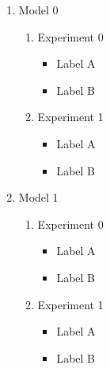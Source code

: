 \begin{enumerate}

\item Model 0

      \begin{enumerate}

      \item Experiment 0

            \begin{itemize}
	    \item Label A
	    \item Label B
	    \end{itemize}

      \item Experiment 1

            \begin{itemize}
	    \item Label A
	    \item Label B
	    \end{itemize}

      \end{enumerate}


\item Model 1

      \begin{enumerate}

      \item Experiment 0

            \begin{itemize}
	    \item Label A
	    \item Label B
	    \end{itemize}

      \item Experiment 1

            \begin{itemize}
	    \item Label A
	    \item Label B
	    \end{itemize}


\end{enumerate}
\end{enumerate}
